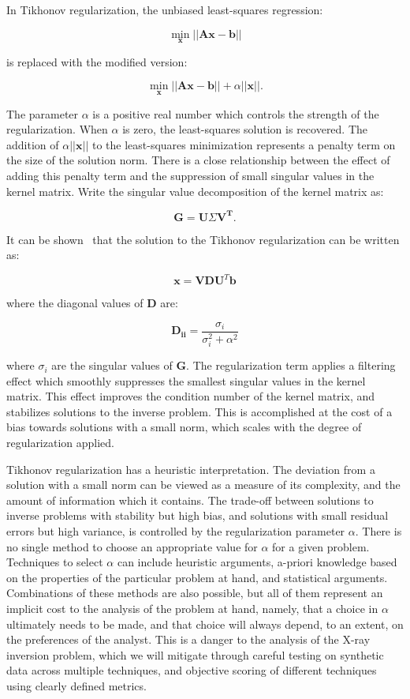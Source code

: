 In Tikhonov regularization, the unbiased least-squares regression:

$$\min_{\mathbf{x}} \vert \vert \mathbf{A} \mathbf{x} - \mathbf{b} \vert \vert $$

is replaced with the modified version:

$$\min_{\mathbf{x}} \vert \vert \mathbf{A} \mathbf{x} - \mathbf{b} \vert \vert + \alpha \vert \vert \mathbf{x} \vert \vert.$$

The parameter $\alpha$ is a positive real number which controls the strength of the regularization. When $\alpha$ is zero, the least-squares solution is recovered. The addition of $\alpha \vert \vert \mathbf{x} \vert \vert$ to the least-squares minimization represents a penalty term on the size of the solution norm. There is a close relationship between the effect of adding this penalty term and the suppression of small singular values in the kernel matrix. Write the singular value decomposition of the kernel matrix as:

$$\mathbf{G} = \mathbf{U}\Sigma\mathbf{V^T}.$$

It can be shown~\citep{Hansen2006} that the solution to the Tikhonov regularization can be written as:

$$\mathbf{x} = \mathbf{V}\mathbf{D}\mathbf{U}^T \mathbf{b} $$

where the diagonal values of $\mathbf{D}$ are:

$$\mathbf{D_{ii}} = \frac{\sigma_i}{\sigma_i^2 + \alpha^2}$$

where $\sigma_i$ are the singular values of $\mathbf{G}$. The regularization term applies a filtering effect which smoothly suppresses the smallest singular values in the kernel matrix. This effect improves the condition number of the kernel matrix, and stabilizes solutions to the inverse problem. This is accomplished at the cost of a bias towards solutions with a small norm, which scales with the degree of regularization applied. 

Tikhonov regularization has a heuristic interpretation. The deviation from a solution with a small norm can be viewed as a measure of its complexity, and the amount of information which it contains. The trade-off between solutions to inverse problems with stability but high bias, and solutions with small residual errors but high variance, is controlled by the regularization parameter $\alpha$. There is no single method to choose an appropriate value for $\alpha$ for a given problem. Techniques to select $\alpha$ can include heuristic arguments, a-priori knowledge based on the properties of the particular problem at hand, and statistical arguments. Combinations of these methods are also possible, but all of them represent an implicit cost to the analysis of the problem at hand, namely, that a choice in $\alpha$ ultimately needs to be made, and that choice will always depend, to an extent, on the preferences of the analyst. This is a danger to the analysis of the X-ray inversion problem, which we will mitigate through careful testing on synthetic data across multiple techniques, and objective scoring of different techniques using clearly defined metrics. 

